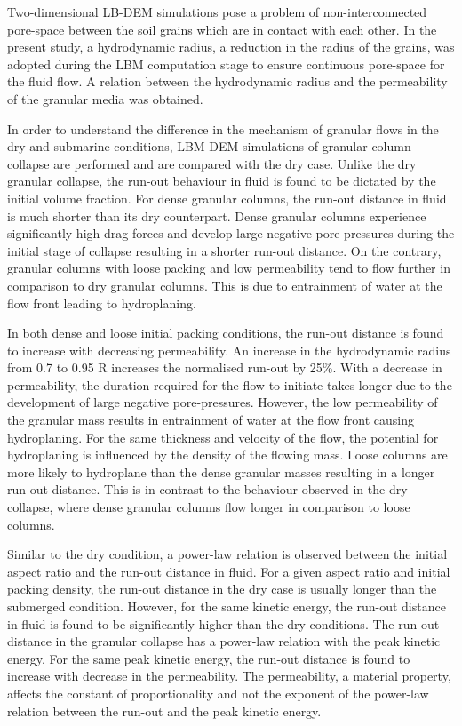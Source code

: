 Two-dimensional LB-DEM simulations pose a problem of non-interconnected 
pore-space between the soil grains which are in contact with each other. In 
the present study, a hydrodynamic radius, a reduction in the radius of the 
grains, was adopted during the LBM computation stage to ensure continuous 
pore-space for the fluid flow. A relation between the hydrodynamic radius and 
the permeability of the granular media was obtained. 

In order to understand the difference in the mechanism of granular flows in the 
dry and submarine conditions, LBM-DEM simulations of granular column collapse 
are performed and are compared with the dry case. Unlike the dry granular 
collapse, the run-out behaviour in fluid is found to be dictated by the initial 
volume fraction. For dense granular columns, the run-out distance in fluid is 
much shorter than its dry counterpart. Dense granular columns experience 
significantly high drag forces and develop large negative pore-pressures during 
the initial stage of collapse resulting in a shorter run-out distance. On the 
contrary, granular columns with loose packing and low permeability tend to flow 
further in comparison to dry granular columns. This is due to entrainment of 
water at the flow front leading to hydroplaning. 

In both dense and loose initial packing conditions, the run-out distance is 
found to increase with decreasing permeability. An increase in the 
hydrodynamic radius from 0.7 to 0.95 R increases the
normalised run-out by 25\%. With a decrease in permeability, the duration 
required for the flow to initiate takes longer due to the development of large 
negative pore-pressures. However, the low permeability of the granular mass 
results in entrainment of water at the flow front causing hydroplaning. For the 
same thickness and velocity of the flow, the potential for hydroplaning is 
influenced by the density of the flowing mass. Loose columns are more likely to 
hydroplane than the dense granular masses resulting in a longer run-out 
distance. This is in contrast to the behaviour observed in the dry collapse, 
where dense granular columns flow longer in comparison to loose columns.

Similar to the dry condition, a power-law relation is observed between the 
initial aspect ratio and the run-out distance in fluid. For a given 
aspect ratio and initial packing density, the run-out distance in the dry case 
is usually longer than the submerged condition. However, for the same kinetic 
energy, the run-out distance in fluid is found to be significantly higher than 
the dry conditions. The run-out distance in the granular collapse has a 
power-law relation with the peak kinetic energy. For the same peak kinetic 
energy, the run-out distance is found to increase with decrease in the 
permeability. The permeability, a material property, affects the constant of 
proportionality and not the exponent of the power-law relation between the 
run-out and the peak kinetic energy.

